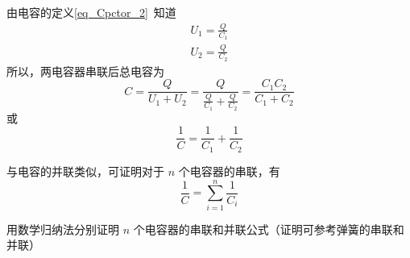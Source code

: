 由电容的定义\autoref{eq_Cpctor_2}~知道
\begin{equation}
\begin{aligned}
U_1=\frac{Q}{C_1}\\
U_2=\frac{Q}{C_2}
\end{aligned}
\end{equation}
所以，两电容器串联后总电容为
\begin{equation}
{C} = \frac{Q}{U_1+U_2} = \frac{Q}{\frac{Q}{C_1}+\frac{Q}{C_2}} = \frac{C_1C_2}{C_1 + C_2}
\end{equation}
或
\begin{equation}
\frac{1}{C}=\frac{1}{C_1}+\frac{1}{C_2}
\end{equation}

与电容的并联类似，可证明对于 $n$ 个电容器的串联，有
\begin{equation}
\frac{1}{C}=\sum_{i=1}^{n}\frac{1}{C_i}
\end{equation}
\begin{exercise}{}
用数学归纳法分别证明 $n$ 个电容器的串联和并联公式（证明可参考弹簧的串联和并联）
\end{exercise}

